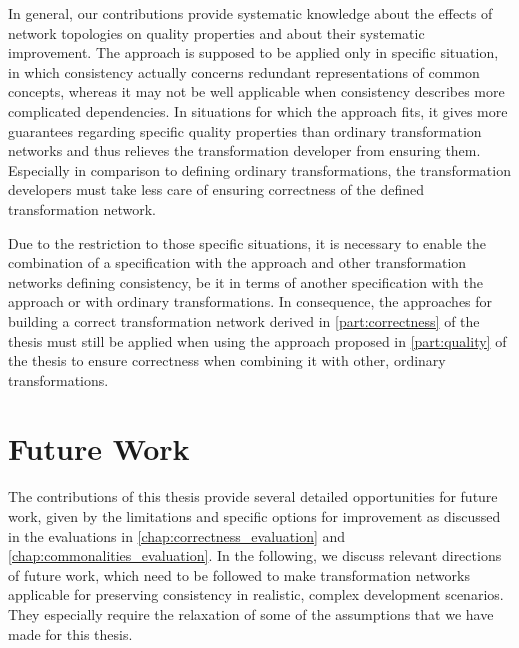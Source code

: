 In general, our contributions provide systematic knowledge about the effects of network topologies on quality properties and about their systematic improvement.
The \commonalities approach is supposed to be applied only in specific situation, in which consistency actually concerns redundant representations of common concepts, whereas it may not be well applicable when consistency describes more complicated dependencies.
In situations for which the approach fits, it gives more guarantees regarding specific quality properties than ordinary transformation networks and thus relieves the transformation developer from ensuring them.
Especially in comparison to defining ordinary transformations, the transformation developers must take less care of ensuring correctness of the defined transformation network.

Due to the restriction to those specific situations, it is necessary to enable the combination of a specification with the \commonalities approach and other transformation networks defining consistency, be it in terms of another specification with the \commonalities approach or with ordinary transformations.
In consequence, the approaches for building a correct transformation network derived in \autoref{part:correctness} of the thesis must still be applied when using the \commonalities approach proposed in \autoref{part:quality} of the thesis to ensure correctness when combining it with other, ordinary transformations.


\section{Future Work}
\label{chap:conclusions:futurework}

The contributions of this thesis provide several detailed opportunities for future work, given by the limitations and specific options for improvement as discussed in the evaluations in \autoref{chap:correctness_evaluation} and \autoref{chap:commonalities_evaluation}.
In the following, we discuss relevant directions of future work, which need to be followed to make transformation networks applicable for preserving consistency in realistic, complex development scenarios.
They especially require the relaxation of some of the assumptions that we have made for this thesis.

